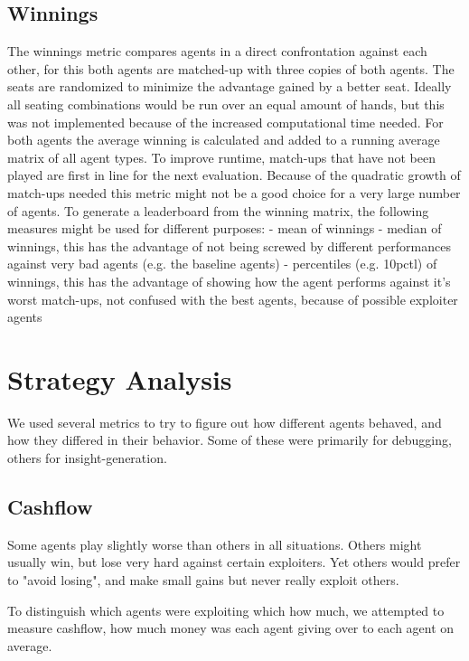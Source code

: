 \subsection{Winnings}
The winnings metric compares agents in a direct confrontation against each other, for this both agents are matched-up with three copies of both agents. The seats are randomized to minimize the advantage gained by a better seat. Ideally all seating combinations would be run over an equal amount of hands, but this was not implemented because of the increased computational time needed. For both agents the average winning is calculated and added to a running average matrix of all agent types.  To improve runtime, match-ups that have not been played are first in line for the next evaluation. Because of the quadratic growth of match-ups needed this metric might not be a good choice for a very large number of agents.
To generate a leaderboard from the winning matrix, the following measures might be used for different purposes:
- mean of winnings
- median of winnings, this has the advantage of not being screwed by different performances against very bad agents (e.g. the baseline agents)
- percentiles (e.g. 10pctl) of winnings, this has the advantage of showing how the agent performs against it's worst match-ups, not confused with the best agents, because of possible exploiter agents


\section{Strategy Analysis}

We used several metrics to try to figure out how different agents behaved, and how they differed in their behavior. Some of these were primarily for debugging, others for insight-generation.

\subsection{Cashflow}

Some agents play slightly worse than others in all situations. Others might usually win, but lose very hard against certain exploiters. Yet others would prefer to "avoid losing", and make small gains but never really exploit others.

To distinguish which agents were exploiting which how much, we attempted to measure cashflow, how much money was each agent giving over to each agent on average.

